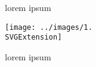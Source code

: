 


\label{0}

lorem ipsum


\begin{minipage}{1.0\linewidth}
\begin{center}
\texttt{[image: ../images/1.\\SVGExtension]}
\end{center}
\raggedright{}
\end{minipage}\vspace{0.75cm}


lorem ipsum




